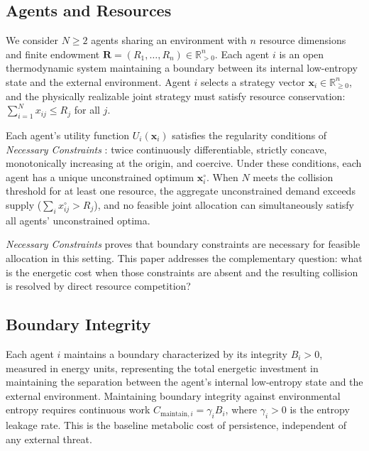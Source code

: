 \documentclass[11pt]{article}
\theoremstyle{plain}
\theoremstyle{definition}
\theoremstyle{remark}
\let\origsubsection\subsection
\renewcommand{\subsection}{\needspace{7\baselineskip}\origsubsection}
\begin{document}
\subsection{Agents and Resources}\label{agents-and-resources}

We consider \(N \geq 2\) agents sharing an environment with \(n\)
resource dimensions and finite endowment
\(\mathbf{R} = (R_1, \ldots, R_n) \in \mathbb{R}_{>0}^n\). Each agent
\(i\) is an open thermodynamic system maintaining a boundary between its
internal low-entropy state and the external environment. Agent \(i\)
selects a strategy vector \(\mathbf{x}_i \in \mathbb{R}_{\geq 0}^n\),
and the physically realizable joint strategy must satisfy resource
conservation: \(\sum_{i=1}^N x_{ij} \leq R_j\) for all \(j\).

Each agent's utility function \(U_i(\mathbf{x}_i)\) satisfies the
regularity conditions of \emph{Necessary Constraints} \citep{TC-I}:
twice continuously differentiable, strictly concave, monotonically
increasing at the origin, and coercive. Under these conditions, each
agent has a unique unconstrained optimum \(\mathbf{x}_i^{\circ}\). When
\(N\) meets the collision threshold for at least one resource, the
aggregate unconstrained demand exceeds supply
(\(\sum_i x_{ij}^{\circ} > R_j\)), and no feasible joint allocation can
simultaneously satisfy all agents' unconstrained optima.

\emph{Necessary Constraints} \citep{TC-I} proves that boundary
constraints are necessary for feasible allocation in this setting. This
paper addresses the complementary question: what is the energetic cost
when those constraints are absent and the resulting collision is
resolved by direct resource competition?

\subsection{Boundary Integrity}\label{boundary-integrity}

Each agent \(i\) maintains a boundary characterized by its integrity
\(B_i > 0\), measured in energy units, representing the total energetic
investment in maintaining the separation between the agent's internal
low-entropy state and the external environment. Maintaining boundary
integrity against environmental entropy requires continuous work
\(C_{\text{maintain},i} = \gamma_i B_i\), where \(\gamma_i > 0\) is the
entropy leakage rate. This is the baseline metabolic cost of
persistence, independent of any external threat.
\end{document}
